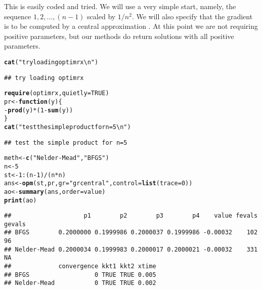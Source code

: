 \documentclass[11pt]{article}\usepackage[]{graphicx}\usepackage[]{color}
\makeatletter
\newcommand{\hlnum}[1]{\textcolor[rgb]{0.686,0.059,0.569}{#1}}%
\newcommand{\hlstr}[1]{\textcolor[rgb]{0.192,0.494,0.8}{#1}}%
\newcommand{\hlopt}[1]{\textcolor[rgb]{0,0,0}{#1}}%
\newcommand{\hlstd}[1]{\textcolor[rgb]{0.345,0.345,0.345}{#1}}%
\newcommand{\hlkwa}[1]{\textcolor[rgb]{0.161,0.373,0.58}{\textbf{#1}}}%
\newcommand{\hlkwb}[1]{\textcolor[rgb]{0.69,0.353,0.396}{#1}}%
\newcommand{\hlkwc}[1]{\textcolor[rgb]{0.333,0.667,0.333}{#1}}%
\newcommand{\hlkwd}[1]{\textcolor[rgb]{0.737,0.353,0.396}{\textbf{#1}}}%
\newenvironment{kframe}{%
 \def\at@end@of@kframe{}%
 \ifinner\ifhmode%
  \def\at@end@of@kframe{\end{minipage}}%
  \begin{minipage}{\columnwidth}%
 \fi\fi%
 \def\FrameCommand##1{\hskip\@totalleftmargin \hskip-\fboxsep
 \colorbox{shadecolor}{##1}\hskip-\fboxsep
     \hskip-\linewidth \hskip-\@totalleftmargin \hskip\columnwidth}%
 \MakeFramed {\advance\hsize-\width
   \@totalleftmargin\z@ \linewidth\hsize
   \@setminipage}}%
 {\par\unskip\endMakeFramed%
 \at@end@of@kframe}
\newenvironment{knitrout}{}{} %
\makeatother
\begin{document}
\vspace*{10pt}
This is easily coded and tried. We will use a very simple start, namely, the sequence $1,2, ...,
(n-1)$ scaled by $1/n^2$. We will also specify that the gradient is to be computed by a 
central approximation \citep{optextras}. At this point we are not requiring positive
parameters, but our methods do return solutions with all positive parameters.

\begin{knitrout}\scriptsize
{}\color{fgcolor}\begin{kframe}
\begin{alltt}
\hlkwd{cat}\hlstd{(}\hlstr{"try loading optimrx\textbackslash{}n"}\hlstd{)}
\end{alltt}
\begin{verbatim}
## try loading optimrx
\end{verbatim}
\begin{alltt}
\hlkwd{require}\hlstd{(optimrx,} \hlkwc{quietly}\hlstd{=}\hlnum{TRUE}\hlstd{)}
\hlstd{pr} \hlkwb{<-} \hlkwa{function}\hlstd{(}\hlkwc{y}\hlstd{) \{}
\hlopt{-} \hlkwd{prod}\hlstd{(y)}\hlopt{*}\hlstd{(}\hlnum{1}\hlopt{-}\hlkwd{sum}\hlstd{(y))}
\hlstd{\}}
\hlkwd{cat}\hlstd{(}\hlstr{"test the simple product for n=5\textbackslash{}n"}\hlstd{)}
\end{alltt}
\begin{verbatim}
## test the simple product for n=5
\end{verbatim}
\begin{alltt}
\hlstd{meth} \hlkwb{<-} \hlkwd{c}\hlstd{(}\hlstr{"Nelder-Mead"}\hlstd{,} \hlstr{"BFGS"}\hlstd{)}
\hlstd{n}\hlkwb{<-}\hlnum{5}
  \hlstd{st}\hlkwb{<-}\hlnum{1}\hlopt{:}\hlstd{(n}\hlopt{-}\hlnum{1}\hlstd{)}\hlopt{/}\hlstd{(n}\hlopt{*}\hlstd{n)}
   \hlstd{ans}\hlkwb{<-}\hlkwd{opm}\hlstd{(st, pr,} \hlkwc{gr}\hlstd{=}\hlstr{"grcentral"}\hlstd{,} \hlkwc{control}\hlstd{=}\hlkwd{list}\hlstd{(}\hlkwc{trace}\hlstd{=}\hlnum{0}\hlstd{))}
   \hlstd{ao}\hlkwb{<-}\hlkwd{summary}\hlstd{(ans,}\hlkwc{order}\hlstd{=value)}
\hlkwd{print}\hlstd{(ao)}
\end{alltt}
\begin{verbatim}
##                    p1        p2        p3        p4    value fevals gevals
## BFGS        0.2000000 0.1999986 0.2000037 0.1999986 -0.00032    102     96
## Nelder-Mead 0.2000034 0.1999983 0.2000017 0.2000021 -0.00032    331     NA
##             convergence kkt1 kkt2 xtime
## BFGS                  0 TRUE TRUE 0.005
## Nelder-Mead           0 TRUE TRUE 0.002
\end{verbatim}
\end{kframe}
\end{knitrout}
\end{document}
